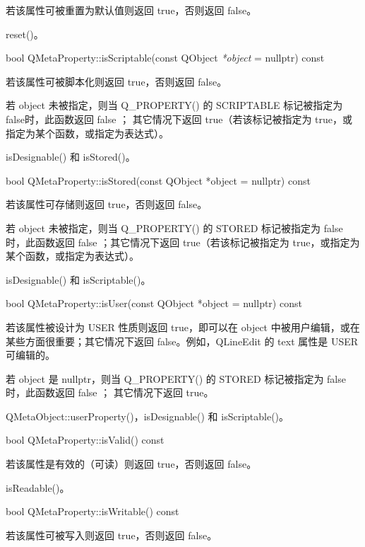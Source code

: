 若该属性可被重置为默认值则返回 true，否则返回 false。

\begin{seeAlso}
reset()。
\end{seeAlso}

bool QMetaProperty::isScriptable(const QObject \emph{*object} = nullptr) const

若该属性可被脚本化则返回 true，否则返回 false。

若 object 未被指定，则当 Q\_PROPERTY() 的 SCRIPTABLE 标记被指定为 false时，此函数返回 false ；
其它情况下返回 true（若该标记被指定为 true，或指定为某个函数，或指定为表达式）。

\begin{seeAlso}
isDesignable() 和 isStored()。
\end{seeAlso}

bool QMetaProperty::isStored(const QObject *object = nullptr) const

若该属性可存储则返回 true，否则返回 false。

若 object 未被指定，则当 Q\_PROPERTY() 的 STORED 标记被指定为 false时，此函数返回 false ；其它情况下返回 true（若该标记被指定为 true，或指定为某个函数，或指定为表达式）。

\begin{seeAlso}
isDesignable() 和 isScriptable()。
\end{seeAlso}

bool QMetaProperty::isUser(const QObject *object = nullptr) const

若该属性被设计为 USER 性质则返回 true，即可以在 object 中被用户编辑，或在某些方面很重要；其它情况下返回 false。例如，QLineEdit 的 text 属性是 USER 可编辑的。

若 object 是 nullptr，则当 Q\_PROPERTY() 的 STORED 标记被指定为 false时，此函数返回 false ；
其它情况下返回 true。

\begin{seeAlso}
QMetaObject::userProperty()，isDesignable() 和 isScriptable()。
\end{seeAlso}

bool QMetaProperty::isValid() const

若该属性是有效的（可读）则返回 true，否则返回 false。

\begin{seeAlso}
isReadable()。
\end{seeAlso}

bool QMetaProperty::isWritable() const

若该属性可被写入则返回 true，否则返回 false。

